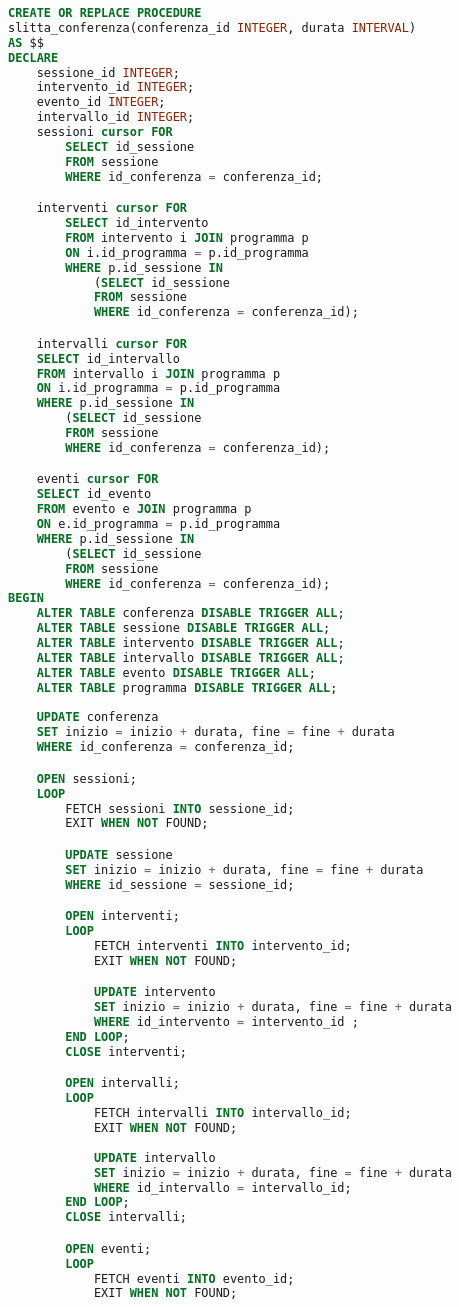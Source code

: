 \begin{lstlisting}[language=SQL,style=mystyle]
	CREATE OR REPLACE PROCEDURE 
slitta_conferenza(conferenza_id INTEGER, durata INTERVAL)
AS $$
DECLARE
	sessione_id INTEGER;
	intervento_id INTEGER;
	evento_id INTEGER;
	intervallo_id INTEGER;
	sessioni cursor FOR 
		SELECT id_sessione 
		FROM sessione 
		WHERE id_conferenza = conferenza_id;

	interventi cursor FOR
		SELECT id_intervento 
		FROM intervento i JOIN programma p 
		ON i.id_programma = p.id_programma 
		WHERE p.id_sessione IN 
			(SELECT id_sessione 
			FROM sessione 
			WHERE id_conferenza = conferenza_id);

	intervalli cursor FOR
	SELECT id_intervallo 
	FROM intervallo i JOIN programma p 
	ON i.id_programma = p.id_programma 
	WHERE p.id_sessione IN 
		(SELECT id_sessione 
		FROM sessione 
		WHERE id_conferenza = conferenza_id);

	eventi cursor FOR
	SELECT id_evento 
	FROM evento e JOIN programma p 
	ON e.id_programma = p.id_programma 
	WHERE p.id_sessione IN 
		(SELECT id_sessione 
		FROM sessione 
		WHERE id_conferenza = conferenza_id);
BEGIN
	ALTER TABLE conferenza DISABLE TRIGGER ALL;
	ALTER TABLE sessione DISABLE TRIGGER ALL;
	ALTER TABLE intervento DISABLE TRIGGER ALL;
	ALTER TABLE intervallo DISABLE TRIGGER ALL;
	ALTER TABLE evento DISABLE TRIGGER ALL;
	ALTER TABLE programma DISABLE TRIGGER ALL;
	
	UPDATE conferenza
	SET inizio = inizio + durata, fine = fine + durata
	WHERE id_conferenza = conferenza_id;

	OPEN sessioni;
	LOOP
		FETCH sessioni INTO sessione_id;
		EXIT WHEN NOT FOUND;

		UPDATE sessione
		SET inizio = inizio + durata, fine = fine + durata
		WHERE id_sessione = sessione_id;

		OPEN interventi;
		LOOP
			FETCH interventi INTO intervento_id;
			EXIT WHEN NOT FOUND;

			UPDATE intervento
			SET inizio = inizio + durata, fine = fine + durata
			WHERE id_intervento = intervento_id ;
		END LOOP;
		CLOSE interventi;

		OPEN intervalli;
		LOOP
			FETCH intervalli INTO intervallo_id;
			EXIT WHEN NOT FOUND;
	
			UPDATE intervallo
			SET inizio = inizio + durata, fine = fine + durata
			WHERE id_intervallo = intervallo_id;
		END LOOP;
		CLOSE intervalli;

		OPEN eventi;
		LOOP
			FETCH eventi INTO evento_id;
			EXIT WHEN NOT FOUND;


\end{lstlisting}
